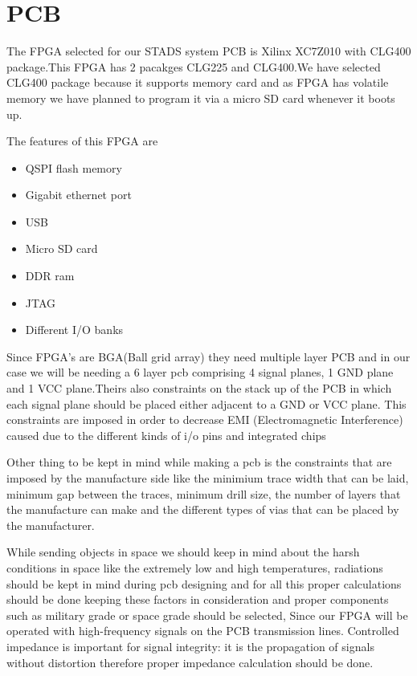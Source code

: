\section{PCB}
\thispagestyle{fancy}

The FPGA selected for our STADS system PCB is Xilinx XC7Z010 with CLG400 package.This FPGA has 2 pacakges CLG225 and CLG400.We have selected CLG400 package because it supports memory card and as FPGA has volatile memory we have planned to program it via a micro SD card whenever it boots up.

The features of this FPGA are
\begin{itemize}
    \item {QSPI flash memory }
    \item {Gigabit ethernet port}
    \item {USB}
    \item {Micro SD card}
    \item {DDR ram}
    \item {JTAG}
    \item {Different I/O banks}
\end{itemize}

Since FPGA's are BGA(Ball grid array) they need multiple layer PCB and in our case we will be needing a 6 layer pcb comprising 4 signal planes, 1 GND plane and 1 VCC plane.Theirs also constraints on the stack up of the PCB in which each signal plane should be placed either adjacent to a GND or VCC plane. This constraints are imposed in order to decrease EMI (Electromagnetic Interference) caused due to the different kinds of i/o pins and integrated chips

Other thing to be kept in mind while making a pcb is the constraints that are imposed by the manufacture side like the minimium trace width that can be laid, minimum gap between the traces, minimum drill size, the number of layers that the manufacture can make and the different types of vias that can be placed by the manufacturer.

While sending objects in space we should keep in mind about the harsh conditions in space like the extremely low and high temperatures, radiations should be kept in mind during pcb designing and for all this proper calculations should be done keeping these factors in consideration and proper components such as military grade or space grade should be selected, Since our FPGA will be operated with high-frequency signals on the PCB transmission lines. Controlled impedance is important for signal integrity: it is the propagation of signals without distortion therefore proper impedance calculation should be done.

